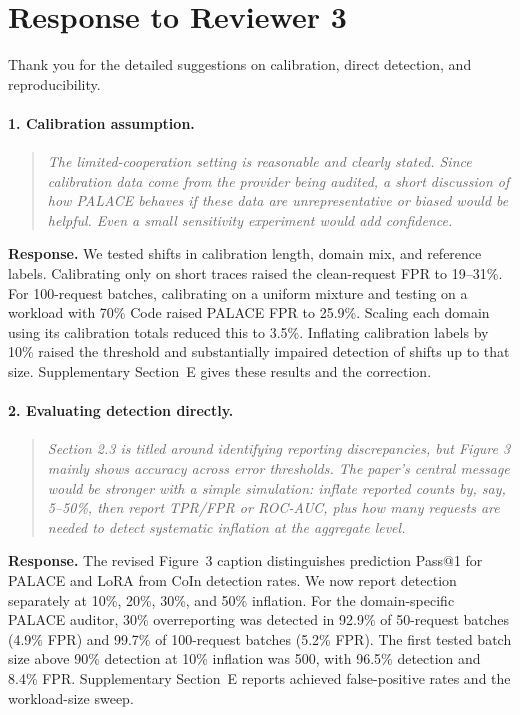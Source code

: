 \documentclass[11pt]{article}
\begin{document}
\section*{Response to Reviewer 3}
Thank you for the detailed suggestions on calibration, direct detection, and reproducibility.

\paragraph{1. Calibration assumption.}
\begin{quote}\small\itshape
The limited-cooperation setting is reasonable and clearly stated. Since calibration data come from the provider being audited, a short discussion of how PALACE behaves if these data are unrepresentative or biased would be helpful. Even a small sensitivity experiment would add confidence.
\end{quote}
\textbf{Response.} We tested shifts in calibration length, domain mix, and reference labels. Calibrating only on short traces raised the clean-request FPR to 19--31\%. For 100-request batches, calibrating on a uniform mixture and testing on a workload with 70\% Code raised PALACE FPR to 25.9\%. Scaling each domain using its calibration totals reduced this to 3.5\%. Inflating calibration labels by 10\% raised the threshold and substantially impaired detection of shifts up to that size. Supplementary Section~E gives these results and the correction.

\paragraph{2. Evaluating detection directly.}
\begin{quote}\small\itshape
Section 2.3 is titled around identifying reporting discrepancies, but Figure 3 mainly shows accuracy across error thresholds. The paper's central message would be stronger with a simple simulation: inflate reported counts by, say, 5--50\%, then report TPR/FPR or ROC-AUC, plus how many requests are needed to detect systematic inflation at the aggregate level.
\end{quote}
\textbf{Response.} The revised Figure~3 caption distinguishes prediction Pass@1 for PALACE and LoRA from CoIn detection rates. We now report detection separately at 10\%, 20\%, 30\%, and 50\% inflation. For the domain-specific PALACE auditor, 30\% overreporting was detected in 92.9\% of 50-request batches (4.9\% FPR) and 99.7\% of 100-request batches (5.2\% FPR). The first tested batch size above 90\% detection at 10\% inflation was 500, with 96.5\% detection and 8.4\% FPR. Supplementary Section~E reports achieved false-positive rates and the workload-size sweep.
\end{document}
